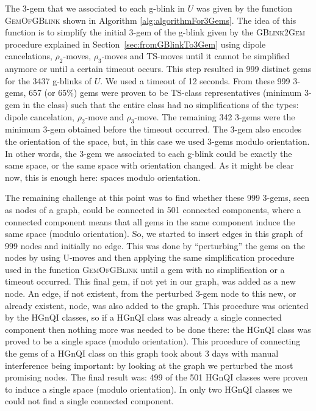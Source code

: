 The 3-gem that we associated to each g-blink in $U$ was given by
the function \textsc{GemOfGBlink} shown in Algorithm \ref{alg:algorithmFor3Gems}.
The idea of this function is to simplify the initial 3-gem of
the g-blink given by the \textsc{GBlink2Gem} procedure explained in
Section~\ref{sec:fromGBlinkTo3Gem} using dipole cancelations,
$\rho_2$-moves, $\rho_3$-moves and TS-moves until it cannot be simplified
anymore or until a certain timeout occurs. This step resulted in 999
distinct gems for the 3437 g-blinks of $U$. We used a timeout of 12 seconds.
From these 999 3-gems, 657 (or 65\%) gems were proven to be
TS-class representatives (minimum 3-gem in the class) such that the entire class
had no simplifications of the types: dipole cancelation, $\rho_2$-move and $\rho_3$-move.
The remaining 342 3-gems were the minimum 3-gem obtained before the timeout
occurred. The 3-gem also encodes the orientation of the space, but, in
this case we used 3-gems modulo orientation. In other words, the 3-gem we
associated to each g-blink could be exactly the same space, or the same
space with orientation changed. As it might be clear now, this is enough
here: spaces modulo orientation.

The remaining challenge at this point was to find whether these 999
3-gems, seen as nodes of a graph, could be connected in 501
connected components, where a connected component means that all
gems in the same component induce the same space (modulo
orientation). So, we started to insert edges in this graph of 999
nodes and initially no edge. This was done by ``perturbing'' the
gems on the nodes by using U-moves and then applying the same
simplification procedure used in the function \textsc{GemOfGBlink}
until a gem with no simplification or a timeout occurred. This final
gem, if not yet in our graph, was added as a new node. An edge, if
not existent, from the perturbed 3-gem node to this new, or already
existent, node, was also added to the graph. This procedure was
oriented by the HGnQI classes, so if a HGnQI class was already a
single connected component then nothing more was needed to be done
there: the HGnQI class was proved to be a single space (modulo
orientation). This procedure of connecting the gems of a HGnQI class
on this graph took about 3 days with manual interference being
important: by looking at the graph we perturbed the most promising
nodes. The final result was: 499 of the 501 HGnQI classes were
proven to induce a single space (modulo orientation). In only two
HGnQI classes we could not find a single connected component.

